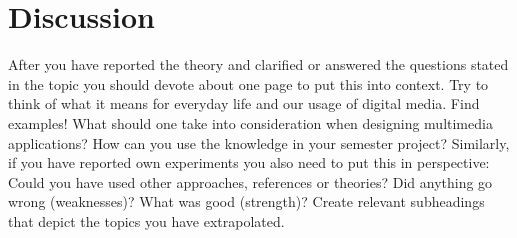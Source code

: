 \documentclass[11pt,a4paper,oneside,table,xcdraw]{article}
\begin{document}
	\section{Discussion}
	After you have reported the theory and clarified or answered the questions stated in
	the topic you should devote about one page to put this into context. Try to think of
	what it means for everyday life and our usage of digital media. Find examples! What
	should one take into consideration when designing multimedia applications? How can
	you use the knowledge in your semester project?
	Similarly, if you have reported own experiments you also need to put this in
	perspective: Could you have used other approaches, references or theories? Did
	anything go wrong (weaknesses)? What was good (strength)? Create relevant
	subheadings that depict the topics you have extrapolated. 
	
\end{document}
